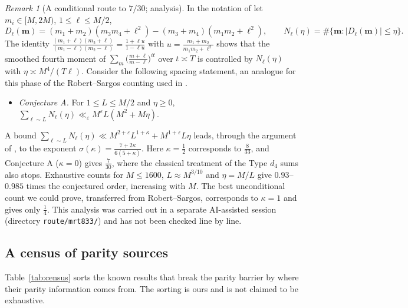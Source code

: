 \documentclass[11pt]{amsart}
\theoremstyle{definition}
\theoremstyle{remark}
\newtheorem{remark}[theorem]{Remark}
\begin{document}
\begin{remark}[A conditional route to $7/30$; analysis]\label{rem:conjA}
In the notation of \cite[\S8]{MRT19} let $m_i\in[M,2M)$, $1\le\ell\le M/2$,
\[
D_\ell(\mathbf m)=(m_1+m_2)(m_3m_4+\ell^2)-(m_3+m_4)(m_1m_2+\ell^2),\qquad N_\ell(\eta)=\#\{\mathbf m:|D_\ell(\mathbf m)|\le\eta\}.
\]
The identity $\frac{(m_1+\ell)(m_2+\ell)}{(m_1-\ell)(m_2-\ell)}=\frac{1+\ell u}{1-\ell u}$ with $u=\frac{m_1+m_2}{m_1m_2+\ell^2}$ shows that the smoothed fourth moment of $\sum_m\bigl(\frac{m+\ell}{m-\ell}\bigr)^{it}$ over $t\asymp T$ is controlled by $N_\ell(\eta)$ with $\eta\asymp M^4/(T\ell)$. Consider the following spacing statement, an analogue for this phase of the Robert--Sargos counting used in \cite{MRT19}.
\begin{itemize}
\item[] \emph{Conjecture A.} For $1\le L\le M/2$ and $\eta\ge0$, $\sum_{\ell\sim L}N_\ell(\eta)\ll_\varepsilon M^{\varepsilon}L(M^2+M\eta)$.
\end{itemize}
A bound $\sum_{\ell\sim L}N_\ell(\eta)\ll M^{2+\varepsilon}L^{1+\kappa}+M^{1+\varepsilon}L\eta$ leads, through the argument of \cite[\S8]{MRT19}, to the exponent $\sigma(\kappa)=\frac{7+2\kappa}{6(5+\kappa)}$. Here $\kappa=\frac12$ corresponds to $\frac8{33}$, and Conjecture A ($\kappa=0$) gives $\frac7{30}$, where the classical treatment of the Type $d_4$ sums also stops. Exhaustive counts for $M\le1600$, $L\approx M^{3/10}$ and $\eta=M/L$ give $0.93$--$0.985$ times the conjectured order, increasing with $M$. The best unconditional count we could prove, transferred from Robert--Sargos, corresponds to $\kappa=1$ and gives only $\frac14$. This analysis was carried out in a separate AI-assisted session (directory \texttt{route/mrt833/}) and has not been checked line by line.
\end{remark}

\subsection{A census of parity sources}\label{sec:census}
Table~\ref{tab:census} sorts the known results that break the parity barrier by where their parity information comes from. The sorting is ours and is not claimed to be exhaustive.
\end{document}
